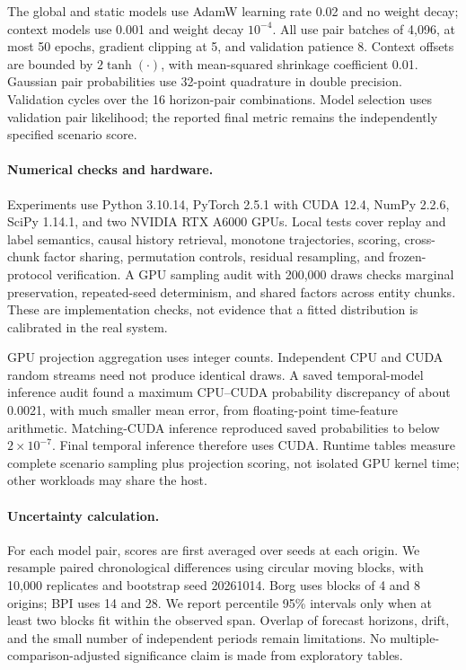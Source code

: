The global and static models use AdamW learning rate 0.02 and no weight decay;
context models use 0.001 and weight decay $10^{-4}$. All use pair batches of
4,096, at most 50 epochs, gradient clipping at 5, and validation patience 8.
Context offsets are bounded by $2\tanh(\cdot)$, with mean-squared shrinkage
coefficient 0.01. Gaussian pair probabilities use 32-point quadrature in double
precision. Validation cycles over the 16 horizon-pair combinations. Model
selection uses validation pair likelihood; the reported final metric remains
the independently specified scenario score.

\paragraph{Numerical checks and hardware.}
Experiments use Python 3.10.14, PyTorch 2.5.1 with CUDA 12.4, NumPy 2.2.6,
SciPy 1.14.1, and two NVIDIA RTX A6000 GPUs. Local tests cover replay and label
semantics, causal history retrieval, monotone trajectories, scoring,
cross-chunk factor sharing, permutation controls, residual resampling, and
frozen-protocol verification. A GPU sampling audit with 200,000 draws checks
marginal preservation, repeated-seed determinism, and shared factors across
entity chunks. These are implementation checks, not evidence that a fitted
distribution is calibrated in the real system.

GPU projection aggregation uses integer counts. Independent CPU and CUDA
random streams need not produce identical draws. A saved temporal-model
inference audit found a maximum CPU--CUDA probability discrepancy of about
0.0021, with much smaller mean error, from floating-point time-feature
arithmetic. Matching-CUDA inference reproduced saved probabilities to below
$2\times10^{-7}$. Final temporal inference therefore uses CUDA. Runtime tables
measure complete scenario sampling plus projection scoring, not isolated GPU
kernel time; other workloads may share the host.

\paragraph{Uncertainty calculation.}
For each model pair, scores are first averaged over seeds at each origin. We
resample paired chronological differences using circular moving blocks, with
10,000 replicates and bootstrap seed 20261014. Borg uses blocks of 4 and 8
origins; BPI uses 14 and 28. We report percentile 95\% intervals only when at
least two blocks fit within the observed span. Overlap of forecast horizons,
drift, and the small number of independent periods remain limitations. No
multiple-comparison-adjusted significance claim is made from exploratory
tables.

